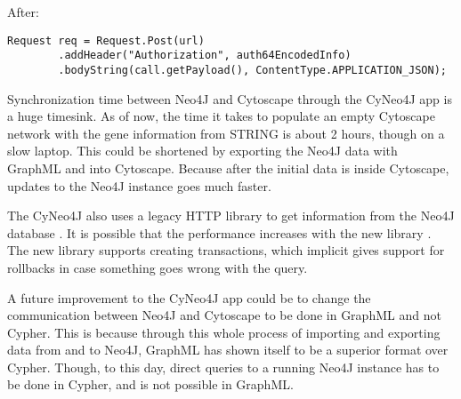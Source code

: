 After:
\begin{verbatim}
Request req = Request.Post(url)
        .addHeader("Authorization", auth64EncodedInfo)
        .bodyString(call.getPayload(), ContentType.APPLICATION_JSON);
\end{verbatim}

Synchronization time between Neo4J and Cytoscape through the CyNeo4J app is a
huge timesink. As of now, the time it takes to populate an empty Cytoscape
network with the gene information from STRING is about 2 hours, though on a slow
laptop. This could be shortened by exporting the Neo4J data with GraphML and
into Cytoscape. Because after the initial data is inside Cytoscape, updates to
the Neo4J instance goes much faster.

The CyNeo4J also uses a legacy HTTP library to get information from the Neo4J
database \cite{legacy-neo4j}. It is possible that the performance increases with
the new library \cite{transactional-neo4j}. The new library supports creating
transactions, which implicit gives support for rollbacks in case something goes
wrong with the query.

A future improvement to the CyNeo4J app could be to change the communication
between Neo4J and Cytoscape to be done in GraphML and not Cypher. This is
because through this whole process of importing and exporting data from and to
Neo4J, GraphML has shown itself to be a superior format over Cypher. Though, to
this day, direct queries to a running Neo4J instance has to be done in Cypher,
and is not possible in GraphML.

